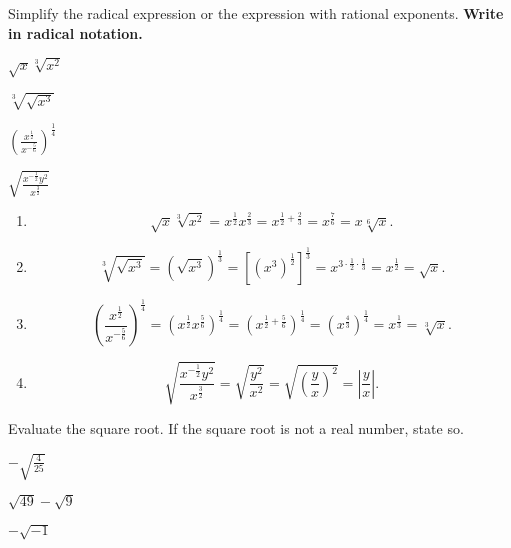 	\begin{example}
		Simplify the radical expression or the expression with rational exponents. \textbf{Write in radical notation.}\\
		\begin{enumerate*}[label={(\arabic*)~}]
			\item $\sqrt{x}\sqrt[3]{x^2}$
			\item $\sqrt[3]{\sqrt{x^3}}$
			\item $\left(\frac{x^{\frac12}}{x^{-\frac56}}\right )^{\frac14}$
			\item $\sqrt{\frac{x^{-\frac12}y^2}{x^{\frac32}}}$
			\hfill\null
		\end{enumerate*}
	\end{example}
	\begin{solution}\mbox{}
		\begin{enumerate}[label={\emph{(\arabic*)}~}]
			\item
			      \[
				      \sqrt{x}\sqrt[3]{x^2}=x^{\frac12}x^{\frac{2}{3}}=x^{\frac{1}{2}+\frac{2}{3}}=x^\frac{7}{6}=x\sqrt[6]{x}.
			      \]
			\item
			      \[
				      \sqrt[3]{\sqrt{x^3}}=(\sqrt{x^3})^\frac{1}{3}=[(x^3)^{\frac{1}{2}}]^{\frac{1}{3}}=x^{3\cdot\frac{1}{2}\cdot\frac{1}{3}}=x^{\frac{1}{2}}=\sqrt{x}.
			      \]
			\item
			      \[
				      \left(\frac{x^{\frac12}}{x^{-\frac56}}\right)^{\frac14}=(x^{\frac12}x^{\frac56})^{\frac14}=(x^{\frac{1}{2}+\frac{5}{6}})^{\frac{1}{4}}=(x^\frac{4}{3})^{\frac{1}{4}}=x^{\frac{1}{3}}=\sqrt[3]{x}.
				  \]
			\item 
			\[
				\sqrt{\frac{x^{-\frac12}y^2}{x^{\frac32}}}=\sqrt{\frac{y^2}{x^2}}=\sqrt{\left(\frac yx\right)^2}=\left|\frac yx\right|.
			\]
		\end{enumerate}
	\end{solution}

\newpage


\begin{exercise}
	Evaluate the square root. If the square root is not a real number, state so.\\
	\begin{enumerate*}[label={(\arabic*)~}]
		\item $-\sqrt{\frac{4}{25}}$%
		\item $\sqrt{49}-\sqrt{9}$ %
		\item $-\sqrt{-1}$\hfill\null\null
	\end{enumerate*}
\end{exercise}



